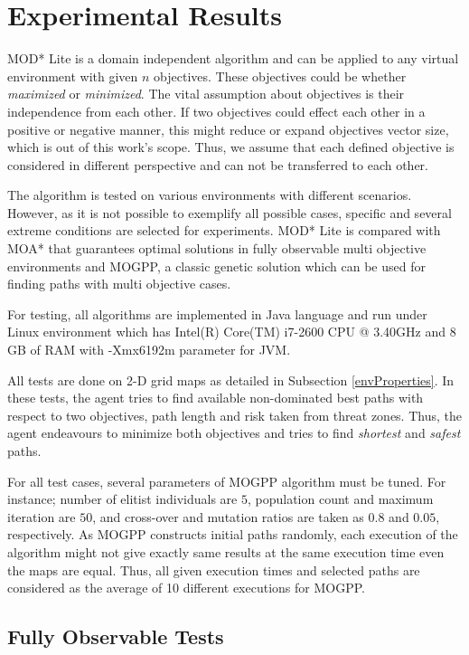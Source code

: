 \section{Experimental Results}
\label{chapter:experiments}

MOD* Lite is a domain independent algorithm and can be applied to any virtual environment with given $n$ objectives. These objectives could be whether \textit{maximized} or \textit{minimized}. The vital assumption about objectives is their independence from each other. If two objectives could effect each other in a positive or negative manner, this might reduce or expand objectives vector size, which is out of this work's scope. Thus, we assume that each defined objective is considered in different perspective and can not be transferred to each other.

The algorithm is tested on various environments with different scenarios. However, as it is not possible to exemplify all possible cases, specific and several extreme conditions are selected for experiments. MOD* Lite is compared with MOA* that guarantees optimal solutions in fully observable multi objective environments and MOGPP, a classic genetic solution which can be used for finding paths with multi objective cases.

For testing, all algorithms are implemented in Java language and run under Linux environment which has Intel(R) Core(TM) i7-2600 CPU @ 3.40GHz and 8 GB of RAM with -Xmx6192m parameter for JVM.

All tests are done on 2-D grid maps as detailed in Subsection \ref{envProperties}. In these tests, the agent tries to find available non-dominated best paths with respect to two objectives, path length and risk taken from threat zones. Thus, the agent endeavours to minimize both objectives and tries to find \textit{shortest} and \textit{safest} paths.

For all test cases, several parameters of MOGPP algorithm must be tuned. For instance; number of elitist individuals are $5$, population count and maximum iteration are $50$, and cross-over and mutation ratios are taken as $0.8$ and $0.05$, respectively. As MOGPP constructs initial paths randomly, each execution of the algorithm might not give exactly same results at the same execution time even the maps are equal. Thus, all given execution times and selected paths are considered as the average of 10 different executions for MOGPP.

\subsection{Fully Observable Tests}

